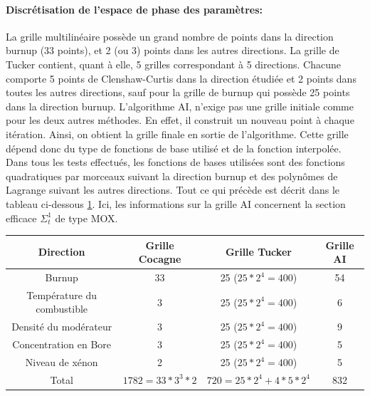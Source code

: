 \paragraph{Discrétisation de l'espace de phase des paramètres:\\}
\hspace{0.5cm} La grille multilinéaire possède un grand nombre de points dans la direction burnup (33 points), et 2 (ou 3) points dans les autres directions. La grille de Tucker contient, quant à elle, 5 grilles correspondant à 5 directions. Chacune comporte 5 points de Clenshaw-Curtis dans la direction étudiée et 2 points dans toutes les autres directions, sauf pour la grille de burnup qui possède 25 points dans la direction burnup.
L'algorithme AI, n'exige pas une grille initiale comme pour les deux autres méthodes. En effet, il construit un nouveau point à chaque itération. Ainsi, on obtient la grille finale en sortie de l'algorithme. Cette grille dépend donc du type de fonctions de base utilisé et de la fonction interpolée.\\
\hspace{0.5cm} Dans tous les tests effectués, les fonctions de bases utilisées sont des fonctions quadratiques par morceaux suivant la direction burnup et des polynômes de Lagrange suivant les autres directions. Tout ce qui précède est décrit dans le tableau ci-dessous \ref{table:discretisation}. Ici, les informations sur la grille AI concernent la section efficace $\Sigma_t^1$ de type MOX.
\begin{center}
\begin{table}[!h]
\begin{tabular}{|*{4}{c|}}
	\hline
	Direction 											& Grille Cocagne  			& Grille Tucker 					 & Grille AI \\
	\hline
	Burnup 			 										& 33 										& 25 ($25*2^4 = 400$) 		 & 	54				\\
	\hline
	Température du combustible			& 3 										& 25 ($25*2^4 = 400$)			 & 	6				 	\\
	\hline
	Densité du modérateur				 		& 3											& 25 ($25*2^4 = 400$) 		 & 	9				\\
	\hline
	Concentration en Bore						& 3 										& 25 ($25*2^4 = 400$)			 & 	5				\\
	\hline
	Niveau de xénon									& 2 										& 25 ($25*2^4 = 400$)			 & 	5				 	\\
	\hline
	Total														& $1782 = 33 * 3^3 * 2$	& $720 = 25*2^4 + 4*5*2^4$ & 	832				 	\\
	\hline
\end{tabular}
\label{table:discretisation}
\end{table}
\end{center}

